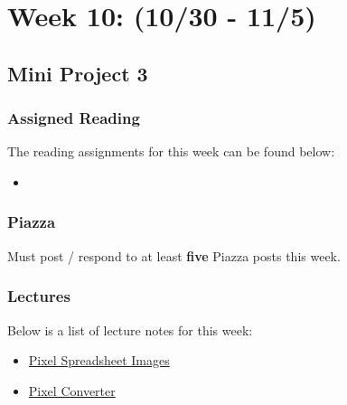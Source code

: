 \clearpage
\chapter{Week 10: (10/30 - 11/5)}

\section{Mini Project 3}

\subsection{Assigned Reading}

The reading assignments for this week can be found below:

\begin{itemize}
    \item {}
\end{itemize}

\subsection{Piazza}

Must post / respond to at least \textbf{five} Piazza posts this week.  

\subsection{Lectures}



\noindent Below is a list of lecture notes for this week:

\begin{itemize}
    \item \href{https://drive.google.com/drive/u/2/folders/1l_JWvAp1gkHM8J09HDKTnmJ_2JoEXgG7}{Pixel Spreadsheet Images}
    \item \href{https://think-maths.co.uk/spreadsheet/}{Pixel Converter}
\end{itemize}

